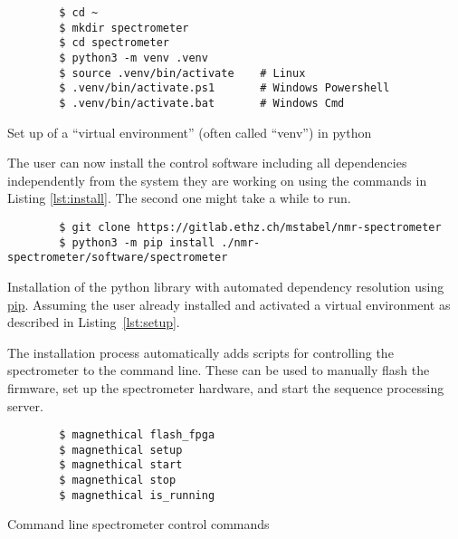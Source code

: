\begin{listing}[h!bt]
    \begin{verbatim}
        $ cd ~
        $ mkdir spectrometer
        $ cd spectrometer
        $ python3 -m venv .venv
        $ source .venv/bin/activate    # Linux
        $ .venv/bin/activate.ps1       # Windows Powershell
        $ .venv/bin/activate.bat       # Windows Cmd
    \end{verbatim}
    \caption{Set up of a \enquote{virtual environment} (often called \enquote{venv}) in \gls{python}}
    \label{lst:setup}
\end{listing}

The user can now install the control software including all dependencies independently from the system they are working on using the commands in Listing \ref{lst:install}. The second one might take a while to run.

\begin{listing}[h!bt]
    \begin{verbatim}
        $ git clone https://gitlab.ethz.ch/mstabel/nmr-spectrometer
        $ python3 -m pip install ./nmr-spectrometer/software/spectrometer
    \end{verbatim}
    \caption{Installation of the python library with automated dependency resolution using \href{https://pypi.org/project/pip/}{\acrshort{pip}}. Assuming the user already installed and activated a virtual environment as described in Listing~\ref{lst:setup}.}
    \label{lst:install}
\end{listing}

The installation process automatically adds scripts for controlling the spectrometer to the command line. These can be used to manually flash the firmware, set up the spectrometer hardware, and start the sequence processing server.

\begin{listing}[h!bt]
    \begin{verbatim}
        $ magnethical flash_fpga
        $ magnethical setup
        $ magnethical start
        $ magnethical stop
        $ magnethical is_running
    \end{verbatim}
    \caption{Command line spectrometer control commands}
    \label{lst:install}
\end{listing}

